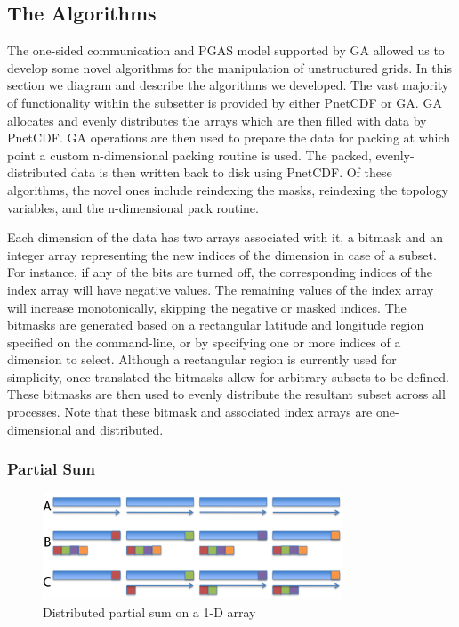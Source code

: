 \subsection{The Algorithms}

The one-sided communication and PGAS model supported by GA allowed us to
develop some novel algorithms for the manipulation of unstructured grids.  In
this section we diagram and describe the algorithms we developed.  The vast
majority of functionality within the subsetter is provided by either PnetCDF
or GA.  GA allocates and evenly distributes the arrays which are then filled
with data by PnetCDF.  GA operations are then used to prepare the data for
packing at which point a custom n-dimensional packing routine is used.  The
packed, evenly-distributed data is then written back to disk using PnetCDF.
Of these algorithms, the novel ones include reindexing the masks, reindexing
the topology variables, and the n-dimensional pack routine.

Each dimension of the data has two arrays associated with it, a bitmask and an
integer array representing the new indices of the dimension in case of a
subset.  For instance, if any of the bits are turned off, the corresponding
indices of the index array will have negative values.  The remaining values of
the index array will increase monotonically, skipping the negative or masked
indices.  The bitmasks are generated based on a rectangular latitude and
longitude region specified on the command-line, or by specifying one or more
indices of a dimension to select.  Although a rectangular region is currently
used for simplicity, once translated the bitmasks allow for arbitrary subsets
to be defined.  These bitmasks are then used to evenly distribute the
resultant subset across all processes.  Note that these bitmask and associated
index arrays are one-dimensional and distributed.

\subsubsection{Partial Sum}

\begin{figure}[!t]
\center
\includegraphics[width=3.5in]{images/partialsum_label}
\caption{Distributed partial sum on a 1-D array}
\label{fig:partialsum}
\end{figure}

